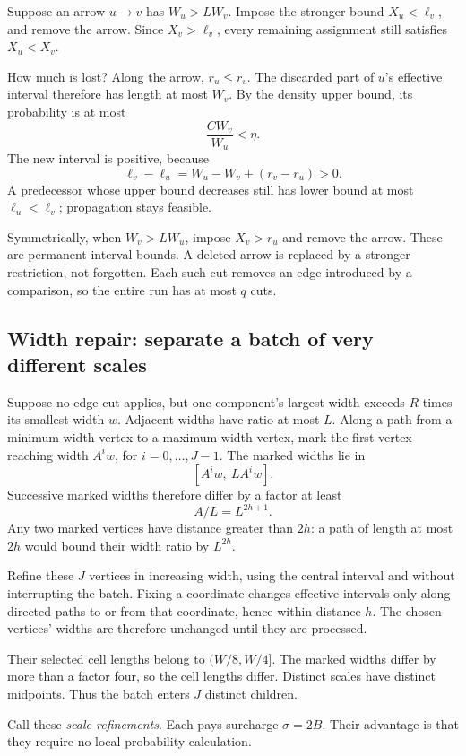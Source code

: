Suppose an arrow \(u\to v\) has \(W_u>LW_v\). Impose the stronger bound \(X_u<\ell_v\), and remove the arrow. Since \(X_v>\ell_v\), every remaining assignment still satisfies \(X_u<X_v\).

How much is lost? Along the arrow, \(r_u\le r_v\). The discarded part of \(u\)'s effective interval therefore has length at most \(W_v\). By the density upper bound, its probability is at most
\[
\frac{C W_v}{W_u}<\eta.
\]
The new interval is positive, because
\[
\ell_v-\ell_u=W_u-W_v+(r_v-r_u)>0.
\]
A predecessor whose upper bound decreases still has lower bound at most \(\ell_u<\ell_v\); propagation stays feasible.

Symmetrically, when \(W_v>LW_u\), impose \(X_v>r_u\) and remove the arrow. These are permanent interval bounds. A deleted arrow is replaced by a stronger restriction, not forgotten. Each such cut removes an edge introduced by a comparison, so the entire run has at most \(q\) cuts.

\subsection{Width repair: separate a batch of very different scales}

Suppose no edge cut applies, but one component's largest width exceeds \(R\) times its smallest width \(w\). Adjacent widths have ratio at most \(L\). Along a path from a minimum-width vertex to a maximum-width vertex, mark the first vertex reaching width \(A^i w\), for \(i=0,\ldots,J-1\). The marked widths lie in
\[
[A^i w,\ LA^i w].
\]
Successive marked widths therefore differ by a factor at least
\[
A/L=L^{2h+1}.
\]
Any two marked vertices have distance greater than \(2h\): a path of length at most \(2h\) would bound their width ratio by \(L^{2h}\).

Refine these \(J\) vertices in increasing width, using the central interval and without interrupting the batch. Fixing a coordinate changes effective intervals only along directed paths to or from that coordinate, hence within distance \(h\). The chosen vertices' widths are therefore unchanged until they are processed.

Their selected cell lengths belong to \((W/8,W/4]\). The marked widths differ by more than a factor four, so the cell lengths differ. Distinct scales have distinct midpoints. Thus the batch enters \(J\) distinct children.

Call these \emph{scale refinements}. Each pays surcharge \(\sigma=2B\). Their advantage is that they require no local probability calculation.

